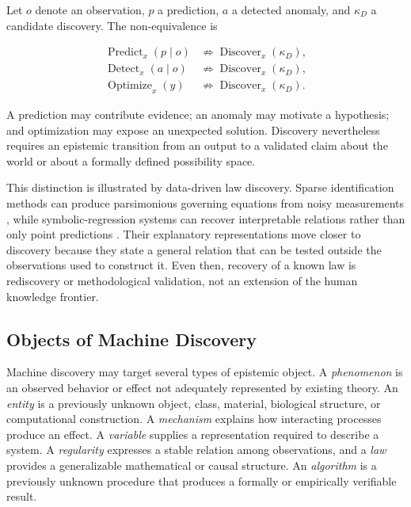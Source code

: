 Let $o$ denote an observation, $p$ a prediction, $a$ a detected anomaly, and
$\kappa_D$ a candidate discovery. The non-equivalence is

\begin{equation}
\begin{aligned}
\operatorname{Predict}_{x}(p\mid o)
&\not\Rightarrow \operatorname{Discover}_{x}(\kappa_D),\\
\operatorname{Detect}_{x}(a\mid o)
&\not\Rightarrow \operatorname{Discover}_{x}(\kappa_D),\\
\operatorname{Optimize}_{x}(y)
&\not\Rightarrow \operatorname{Discover}_{x}(\kappa_D).
\end{aligned}
\label{eq:prediction_not_discovery}
\end{equation}

A prediction may contribute evidence; an anomaly may motivate a hypothesis;
and optimization may expose an unexpected solution. Discovery nevertheless
requires an epistemic transition from an output to a validated claim about the
world or about a formally defined possibility space.

This distinction is illustrated by data-driven law discovery. Sparse
identification methods can produce parsimonious governing equations from noisy
measurements \cite{brunton2016sindy}, while symbolic-regression systems can
recover interpretable relations rather than only point predictions
\cite{schmidt2009laws,udrescu2020aifeynman}. Their explanatory representations
move closer to discovery because they state a general relation that can be
tested outside the observations used to construct it. Even then, recovery of a
known law is rediscovery or methodological validation, not an extension of the
human knowledge frontier.

\subsection{\textbf{Objects of Machine Discovery}}

Machine discovery may target several types of epistemic object. A
\emph{phenomenon} is an observed behavior or effect not adequately represented
by existing theory. An \emph{entity} is a previously unknown object, class,
material, biological structure, or computational construction. A
\emph{mechanism} explains how interacting processes produce an effect. A
\emph{variable} supplies a representation required to describe a system. A
\emph{regularity} expresses a stable relation among observations, and a
\emph{law} provides a generalizable mathematical or causal structure. An
\emph{algorithm} is a previously unknown procedure that produces a formally or
empirically verifiable result.


